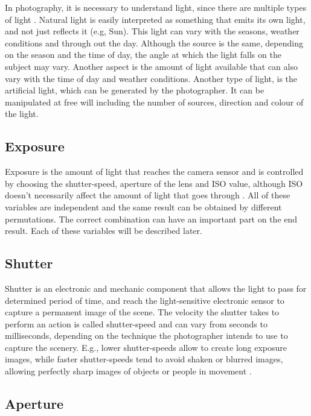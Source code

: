 In photography, it is necessary to understand light, since there are multiple types of light \cite{Santos}. Natural light is easily interpreted as something that emits its own light, and not just reflects it (e.g, Sun). This light can vary with the seasons, weather conditions and through out the day. Although the source is the same, depending on the season and the time of day, the angle at which the light falls on the subject may vary. Another aspect is the amount of light available that can also vary with the time of day and weather conditions.
Another type of light, is the artificial light, which can be generated by the photographer. It can be manipulated at free will including the number of sources, direction and colour of the light.


\subsection{Exposure}
\label{sub:exposure}

Exposure is the amount of light that reaches the camera sensor and is controlled by choosing the shutter-speed, aperture of the lens and ISO value, although ISO doesn't necessarily affect the amount of light that goes through \cite{kamps2012rules, Santos}. All of these variables are independent and the same result can be obtained by different permutations. The correct combination can have an important part on the end result. Each of these variables will be described later.

\subsection{Shutter}
\label{sub:shutter}

Shutter is an electronic and mechanic component that allows the light to pass for determined period of time, and reach the light-sensitive electronic sensor to capture a permanent image of the scene. The velocity the shutter takes to perform an action is called shutter-speed and can vary from seconds to milliseconds, depending on the technique the photographer intends to use to capture the scenery. E.g., lower shutter-speeds allow to create long exposure images, while faster shutter-speeds tend to avoid shaken or blurred images, allowing perfectly sharp images of objects or people in movement \cite{Santos}.

\subsection{Aperture}
\label{sub:aperture}

